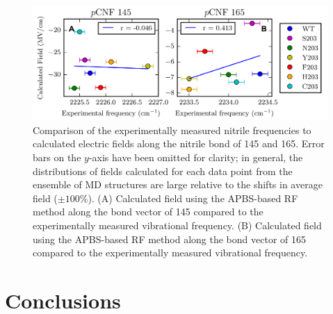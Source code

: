 \begin{figure}
    \center
    \includegraphics[width=\double]{figures-gfp-pKa/calc_forces.png}
    \caption[Comparison of calculated fields against experimental frequencies]{
        Comparison of the experimentally measured nitrile frequencies to calculated electric fields along the nitrile bond of \pCNF{} 145 and 165. 
        Error bars on the $y$-axis have been omitted for clarity; 
        in general, the distributions of fields calculated for each data point from the ensemble of MD structures are large relative to the shifts in average field ($\pm100\%$). 
        (A) Calculated field using the APBS-based RF method along the bond vector of \pCNF{} 145 compared to the experimentally measured vibrational frequency. 
        (B) Calculated field using the APBS-based RF method along the bond vector of \pCNF{} 165 compared to the experimentally measured vibrational frequency.
    }
    \label{fig:calc_forces}
\end{figure}

\section{Conclusions}\label{pKa-conclusion}


